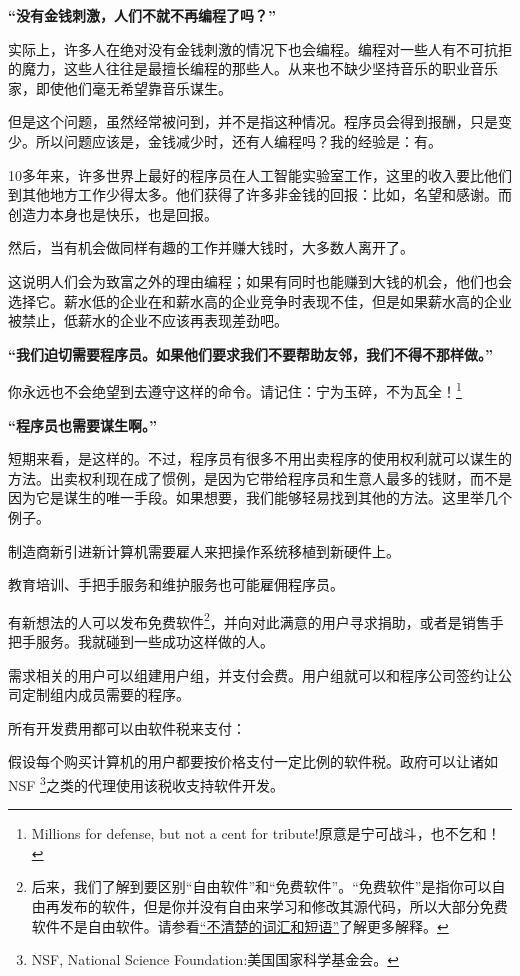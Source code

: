 \bf“没有金钱刺激，人们不就不再编程了吗？”\normalall\par
实际上，许多人在绝对没有金钱刺激的情况下也会编程。编程对一些人有不可抗拒的魔力，这些人往往是最擅长编程的那些人。从来也不缺少坚持音乐的职业音乐家，即使他们毫无希望靠音乐谋生。\par
但是这个问题，虽然经常被问到，并不是指这种情况。程序员会得到报酬，只是变少。所以问题应该是，金钱减少时，还有人编程吗？我的经验是：有。\par
10多年来，许多世界上最好的程序员在人工智能实验室工作，这里的收入要比他们到其他地方工作少得太多。他们获得了许多非金钱的回报：比如，名望和感谢。而创造力本身也是快乐，也是回报。\par
然后，当有机会做同样有趣的工作并赚大钱时，大多数人离开了。\par
这说明人们会为致富之外的理由编程；如果有同时也能赚到大钱的机会，他们也会选择它。薪水低的企业在和薪水高的企业竞争时表现不佳，但是如果薪水高的企业被禁止，低薪水的企业不应该再表现差劲吧。\par
\bf“我们迫切需要程序员。如果他们要求我们不要帮助友邻，我们不得不那样做。”\normalall\par
你永远也不会绝望到去遵守这样的命令。请记住：宁为玉碎，不为瓦全！\footnote{Millions for defense, but not a cent for tribute!原意是宁可战斗，也不乞和！}\par
\bf“程序员也需要谋生啊。”\normalall\par
短期来看，是这样的。不过，程序员有很多不用出卖程序的使用权利就可以谋生的方法。出卖权利现在成了惯例，是因为它带给程序员和生意人最多的钱财，而不是因为它是谋生的唯一手段。如果想要，我们能够轻易找到其他的方法。这里举几个例子。\par
制造商新引进新计算机需要雇人来把操作系统移植到新硬件上。\par
教育培训、手把手服务和维护服务也可能雇佣程序员。\par
有新想法的人可以发布免费软件\footnote{后来，我们了解到要区别“自由软件”和“免费软件”。“免费软件”是指你可以自由再发布的软件，但是你并没有自由来学习和修改其源代码，所以大部分免费软件不是自由软件。请参看\href{http://www.gnu.org/philosophy/words-to-avoid.html\#GiveAwaySoftware}{“不清楚的词汇和短语”}了解更多解释。}，并向对此满意的用户寻求捐助，或者是销售手把手服务。我就碰到一些成功这样做的人。\par
需求相关的用户可以组建用户组，并支付会费。用户组就可以和程序公司签约让公司定制组内成员需要的程序。\par
所有开发费用都可以由软件税来支付：\par
假设每个购买计算机的用户都要按价格支付一定比例的软件税。政府可以让诸如NSF \footnote{NSF, National Science Foundation:美国国家科学基金会。}之类的代理使用该税收支持软件开发。\par
